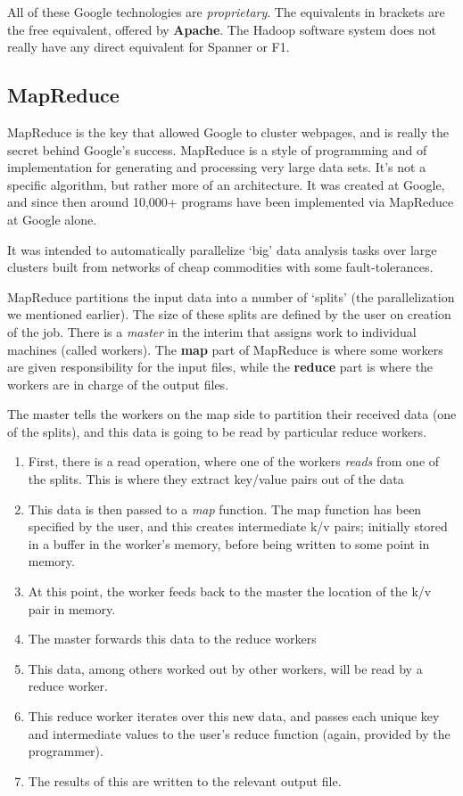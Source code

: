 \documentclass[11pt,a4paper,titlepage,dvipsnames,cmyk]{scrartcl}
\begin{document}
All of these Google technologies are \textit{proprietary}. The equivalents in brackets are the free equivalent, offered by \textbf{Apache}. The Hadoop software system does not really have any direct equivalent for Spanner or F1.

\subsection{MapReduce}
MapReduce is the key that allowed Google to cluster webpages, and is really the secret behind Google's success. MapReduce is a style of programming and of implementation for generating and processing very large data sets. It's not a specific algorithm, but rather more of an architecture. It was created at Google, and since then around 10,000+ programs have been implemented via MapReduce at Google alone.

It was intended to automatically parallelize `big' data analysis tasks over large clusters built from networks of cheap commodities with some fault-tolerances.

MapReduce partitions the input data into a number of `splits' (the parallelization we mentioned earlier). The size of these splits are defined by the user on creation of the job. There is a \textit{master} in the interim that assigns work to individual machines (called workers). The \textbf{map} part of MapReduce is where some workers are given responsibility for the input files, while the \textbf{reduce} part is where the workers are in charge of the output files.

The master tells the workers on the map side to partition their received data (one of the splits), and this data is going to be read by particular reduce workers.

\begin{enumerate}
    \item First, there is a read operation, where one of the workers \textit{reads} from one of the splits. This is where they extract key/value pairs out of the data
    \item This data is then passed to a \textit{map} function. The map function has been specified by the user, and this creates intermediate k/v pairs; initially stored in a buffer in the worker's memory, before being written to some point in memory.
    \item At this point, the worker feeds back to the master the location of the k/v pair in memory.
    \item The master forwards this data to the reduce workers
    \item This data, among others worked out by other workers, will be read by a reduce worker.
    \item This reduce worker iterates over this new data, and passes each unique key and intermediate values to the user's reduce function (again, provided by the programmer).
    \item The results of this are written to the relevant output file.
\end{enumerate}
\end{document}
